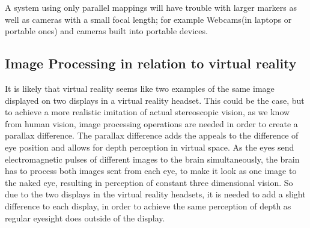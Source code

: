 			A system using only parallel mappings will have trouble with larger markers as well as cameras with a small focal length; for example Webcams(in laptops or portable ones) and cameras built into portable devices.
			
		\subsection{Image Processing in relation to virtual reality}
		It is likely that virtual reality seems like two examples of the same image displayed on two displays in a virtual reality headset. This could be the case, but to achieve a more realistic imitation of actual stereoscopic vision, as we know from human vision, image processing operations are needed in order to create a parallax difference. The parallax difference adds the appeals to the difference of eye position and allows for depth perception in virtual space. As the eyes send electromagnetic pulses of different images to the brain simultaneously, the brain has to process both images sent from each eye, to make it look as one image to the naked eye, resulting in perception of constant three dimensional vision. So due to the two displays in the virtual reality headsets, it is needed to add a slight difference to each display, in order to achieve the same perception of depth as regular eyesight does outside of the display.
												
